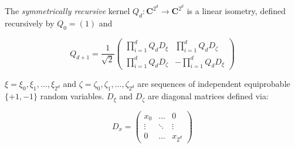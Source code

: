 \documentclass[10pt]{article}
\begin{document}
The \textit{symmetrically recursive} kernel $Q_d:\mathbf{C}^{2^d}\to\mathbf{C}^{2^d}$ is a linear isometry, defined recursively by $Q_0=\left(1\right)$ and

\[
Q_{d+1}=\frac{1}{\sqrt{2}}
\left(
\begin{matrix}
\prod_{i=1}^d Q_d D_{\xi}& \prod_{i=1}^d  Q_d D_{\zeta}\\
\prod_{i=1}^d Q_d D_{\zeta}& -\prod_{i=1}^d  Q_d D_{\xi}
\end{matrix}\right)
\]

$\xi=\xi_0,\xi_1,\dots,\xi_{2^d}$ and $\zeta=\zeta_0,\zeta_1,\dots,\zeta_{2^d}$ are sequences of independent equiprobable $\{+1,-1\}$ random variables. $D_{\xi}$ and $D_{\zeta}$ are diagonal matrices defined via:

\[
D_x = \left(
\begin{matrix}
x_0 & \dots & 0 \\
\vdots & \ddots & \vdots \\
0 & \dots & x_{2^d}
\end{matrix}\right)
\]
\end{document}
